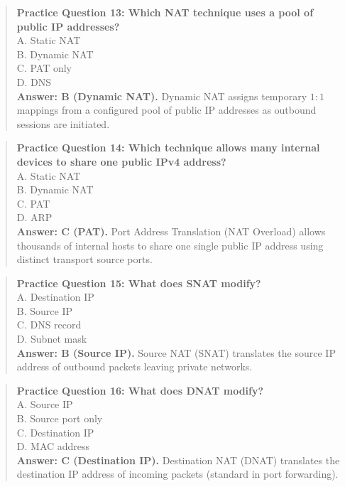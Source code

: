 \begin{quote}
\textbf{Practice Question 13: Which NAT technique uses a pool of public IP addresses?}\\[4pt]
\quad A. Static NAT\\[2pt]
\quad B. Dynamic NAT\\[2pt]
\quad C. PAT only\\[2pt]
\quad D. DNS\\[2pt]
\vspace{4pt}
\textbf{Answer: B (Dynamic NAT).} Dynamic NAT assigns temporary $1:1$ mappings from a configured pool of public IP addresses as outbound sessions are initiated.
\end{quote}
\begin{quote}
\textbf{Practice Question 14: Which technique allows many internal devices to share one public IPv4 address?}\\[4pt]
\quad A. Static NAT\\[2pt]
\quad B. Dynamic NAT\\[2pt]
\quad C. PAT\\[2pt]
\quad D. ARP\\[2pt]
\vspace{4pt}
\textbf{Answer: C (PAT).} Port Address Translation (NAT Overload) allows thousands of internal hosts to share one single public IP address using distinct transport source ports.
\end{quote}
\begin{quote}
\textbf{Practice Question 15: What does SNAT modify?}\\[4pt]
\quad A. Destination IP\\[2pt]
\quad B. Source IP\\[2pt]
\quad C. DNS record\\[2pt]
\quad D. Subnet mask\\[2pt]
\vspace{4pt}
\textbf{Answer: B (Source IP).} Source NAT (SNAT) translates the source IP address of outbound packets leaving private networks.
\end{quote}
\begin{quote}
\textbf{Practice Question 16: What does DNAT modify?}\\[4pt]
\quad A. Source IP\\[2pt]
\quad B. Source port only\\[2pt]
\quad C. Destination IP\\[2pt]
\quad D. MAC address\\[2pt]
\vspace{4pt}
\textbf{Answer: C (Destination IP).} Destination NAT (DNAT) translates the destination IP address of incoming packets (standard in port forwarding).
\end{quote}
